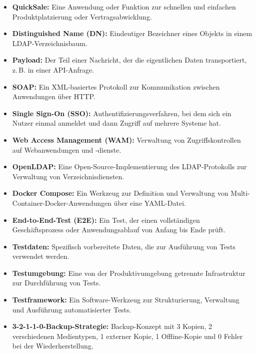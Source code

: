 \begin{itemize}
  \item \textbf{QuickSale:} Eine Anwendung oder Funktion zur schnellen und einfachen Produktplatzierung oder Vertragsabwicklung.

  \item \textbf{Distinguished Name (DN):} Eindeutiger Bezeichner eines Objekts in einem LDAP-Verzeichnisbaum.

  \item \textbf{Payload:} Der Teil einer Nachricht, der die eigentlichen Daten transportiert, z.\,B. in einer API-Anfrage.

  \item \textbf{SOAP:} Ein XML-basiertes Protokoll zur Kommunikation zwischen Anwendungen über HTTP.

  \item \textbf{Single Sign-On (SSO):} Authentifizierungsverfahren, bei dem sich ein Nutzer einmal anmeldet und dann Zugriff auf mehrere Systeme hat.

  \item \textbf{Web Access Management (WAM):} Verwaltung von Zugriffskontrollen auf Webanwendungen und -dienste.

  \item \textbf{OpenLDAP:} Eine Open-Source-Implementierung des LDAP-Protokolls zur Verwaltung von Verzeichnisdiensten.

  \item \textbf{Docker Compose:} Ein Werkzeug zur Definition und Verwaltung von Multi-Container-Docker-Anwendungen über eine YAML-Datei.

  \item \textbf{End-to-End-Test (E2E):} Ein Test, der einen vollständigen Geschäftsprozess oder Anwendungsablauf von Anfang bis Ende prüft.

  \item \textbf{Testdaten:} Spezifisch vorbereitete Daten, die zur Ausführung von Tests verwendet werden.

  \item \textbf{Testumgebung:} Eine von der Produktivumgebung getrennte Infrastruktur zur Durchführung von Tests.

  \item \textbf{Testframework:} Ein Software-Werkzeug zur Strukturierung, Verwaltung und Ausführung automatisierter Tests.

  \item \textbf{3-2-1-1-0-Backup-Strategie:} Backup-Konzept mit 3 Kopien, 2 verschiedenen Medientypen, 1 externer Kopie, 1 Offline-Kopie und 0 Fehler bei der Wiederherstellung.


\end{itemize}
